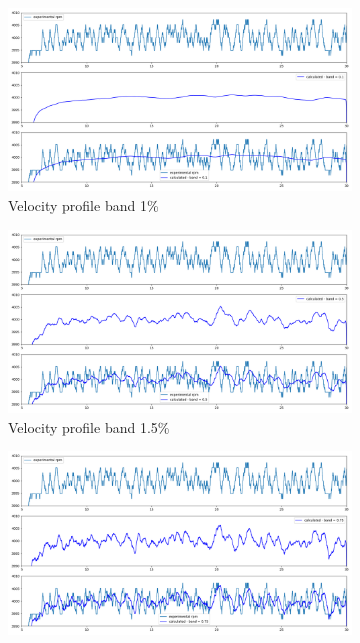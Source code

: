 \documentclass[10pt,fleqn,a4paper,twoside]{article}
\begin{document}
\begin{figure}
    \centering
    \begin{subfigure}{0.4\textwidth}
        \includegraphics[width=\textwidth]{Figures/rpm_analysis_mic0_band_0.1.png}
        \caption{Velocity profile band 1\%}
        \label{fig:first}
    \end{subfigure}
    \hfill
    \centering
    \begin{subfigure}{0.4\textwidth}
        \includegraphics[width=\textwidth]{Figures/rpm_analysis_mic0_band_0.5.png}
        \caption{Velocity profile band 1.5\%}
        \label{fig:second}
    \end{subfigure}
    \hfill
    \centering
    \begin{subfigure}{0.4\textwidth}
        \includegraphics[width=\textwidth]{Figures/rpm_analysis_mic0_band_0.75.png}

\end{subfigure}
\end{figure}
\end{document}
